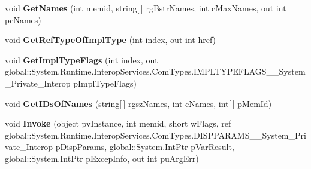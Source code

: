 \begin{DoxyCompactItemize}
void {\bfseries Get\+Names} (int memid, string\mbox{[}$\,$\mbox{]} rg\+Bstr\+Names, int c\+Max\+Names, out int pc\+Names)
\item 
\mbox{\label{interface_system_1_1_runtime_1_1_interop_services_1_1_com_types_1_1_i_type_info_____system___private___interop_a6589519f0c86fa462b9a03ab2a78b59d}} 
void {\bfseries Get\+Ref\+Type\+Of\+Impl\+Type} (int index, out int href)
\item 
\mbox{\label{interface_system_1_1_runtime_1_1_interop_services_1_1_com_types_1_1_i_type_info_____system___private___interop_ae5c606ba7b1dd1ba41edfa764de5bf7f}} 
void {\bfseries Get\+Impl\+Type\+Flags} (int index, out global\+::\+System.\+Runtime.\+Interop\+Services.\+Com\+Types.\+I\+M\+P\+L\+T\+Y\+P\+E\+F\+L\+A\+G\+S\+\_\+\+\_\+\+System\+\_\+\+Private\+\_\+\+Interop p\+Impl\+Type\+Flags)
\item 
\mbox{\label{interface_system_1_1_runtime_1_1_interop_services_1_1_com_types_1_1_i_type_info_____system___private___interop_a6aa20dbdd253a9bb2b4072bf7d6ea031}} 
void {\bfseries Get\+I\+Ds\+Of\+Names} (string\mbox{[}$\,$\mbox{]} rgsz\+Names, int c\+Names, int\mbox{[}$\,$\mbox{]} p\+Mem\+Id)
\item 
\mbox{\label{interface_system_1_1_runtime_1_1_interop_services_1_1_com_types_1_1_i_type_info_____system___private___interop_a75ad94dc5c9adbb0a9b1de1c846b395e}} 
void {\bfseries Invoke} (object pv\+Instance, int memid, short w\+Flags, ref global\+::\+System.\+Runtime.\+Interop\+Services.\+Com\+Types.\+D\+I\+S\+P\+P\+A\+R\+A\+M\+S\+\_\+\+\_\+\+System\+\_\+\+Private\+\_\+\+Interop p\+Disp\+Params, global\+::\+System.\+Int\+Ptr p\+Var\+Result, global\+::\+System.\+Int\+Ptr p\+Excep\+Info, out int pu\+Arg\+Err)
\item 
\mbox{\label{interface_system_1_1_runtime_1_1_interop_services_1_1_com_types_1_1_i_type_info_____system___private___interop_a3c7cc84cf38e70c6a8f2599ea99597fb}} 

\end{DoxyCompactItemize}
